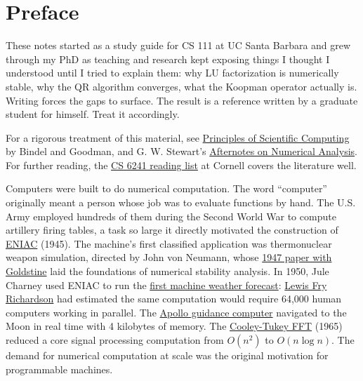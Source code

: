 \documentclass[../readings.tex]{subfiles}
\begin{document}
\section*{Preface}

These notes started as a study guide for CS 111 at UC Santa Barbara and grew through my PhD as teaching and research kept exposing things I thought I understood until I tried to explain them: why LU factorization is numerically stable, why the QR algorithm converges, what the Koopman operator actually is. Writing forces the gaps to surface. The result is a reference written by a graduate student for himself. Treat it accordingly.

\medskip

For a rigorous treatment of this material, see \href{https://math.nyu.edu/~shelley/Classes/SciComp/BindelGoodman.pdf}{Principles of Scientific Computing} by Bindel and Goodman, and G. W. Stewart's \href{https://epubs.siam.org/doi/book/10.1137/1.9781611971491}{Afternotes on Numerical Analysis}. For further reading, the \href{https://www.cs.cornell.edu/courses/cs6241/2025sp/reading.html}{CS 6241 reading list} at Cornell covers the literature well.

\medskip

Computers were built to do numerical computation. The word ``computer'' originally meant a person whose job was to evaluate functions by hand. The U.S. Army employed hundreds of them during the Second World War to compute artillery firing tables, a task so large it directly motivated the construction of \href{https://www.computerhistory.org/revolution/birth-of-the-computer/4/78/323}{ENIAC} (1945). The machine's first classified application was thermonuclear weapon simulation, directed by John von Neumann, whose \href{https://projecteuclid.org/journals/bulletin-of-the-american-mathematical-society-new-series/volume-53/issue-11/Numerical-inverting-of-matrices-of-high-order/bams/1183511222.full}{1947 paper with Goldstine} laid the foundations of numerical stability analysis. In 1950, Jule Charney used ENIAC to run the \href{https://maths.ucd.ie/~plynch/eniac/CFvN-1950.pdf}{first machine weather forecast}: \href{https://archive.org/details/weatherpredictio00richrich}{Lewis Fry Richardson} had estimated the same computation would require 64,000 human computers working in parallel. The \href{https://ntrs.nasa.gov/citations/19760016247}{Apollo guidance computer} navigated to the Moon in real time with 4 kilobytes of memory. The \href{https://www.ams.org/journals/mcom/1965-19-090/S0025-5718-1965-0178586-1/S0025-5718-1965-0178586-1.pdf}{Cooley-Tukey FFT} (1965) reduced a core signal processing computation from $O(n^2)$ to $O(n \log n)$. The demand for numerical computation at scale was the original motivation for programmable machines.
\end{document}
